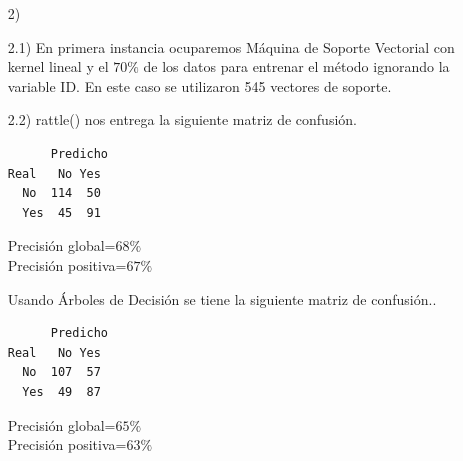 \documentclass[11pt,a4paper]{report}
\begin{document}
\begin{itemize}
\item[2)]
\item[2.1)] En primera instancia ocuparemos Máquina de Soporte Vectorial con kernel lineal y el $70\%$ de los datos para entrenar el método ignorando la variable ID. En este caso se utilizaron 545 vectores de soporte. 
\item[2.2)] rattle() nos entrega la siguiente matriz de confusión.

\begin{verbatim}
      Predicho            
Real   No Yes           
  No  114  50           
  Yes  45  91         
\end{verbatim}
Precisión global=$68\%$ \\
Precisión positiva=$67\%$

Usando Árboles de Decisión se tiene la siguiente matriz de confusión..
\begin{verbatim}
      Predicho
Real   No Yes
  No  107  57
  Yes  49  87
\end{verbatim}
Precisión global=$65\%$\\
Precisión positiva=$63\%$


\end{itemize}
\end{document}
